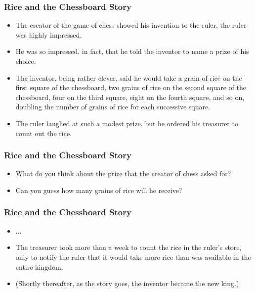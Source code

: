 \documentclass[notheorems
          ]
          {beamer}
\begin{document}
\begin{frame}
 \frametitle { Rice and the Chessboard Story  } 
 

 \begin{itemize}[<*>] 
  \item The creator of the game of chess showed his invention to the ruler, the ruler was highly impressed. 
 
  \item He was so impressed, in fact,  that he told the inventor to name a prize of his choice. 
 
  \item The inventor, being rather clever, said he would take a grain of rice on the first square of the chessboard, two grains of 
 rice on the second square of the chessboard, four on the third square, eight on the fourth square, and so on, doubling the 
 number of grains of rice for each successive square. 
 
  \item The ruler laughed at such a modest prize, but he ordered his treasurer to count out the rice.
 
 \end{itemize}

 

\end{frame}




\begin{frame}
 \frametitle{ Rice and the Chessboard Story  } 
 
 \begin{itemize}
  \item What do you think about the prize that the creator of chess asked for? 
  \item Can you guess how many grains of rice will he receive? 
 \end{itemize}


\end{frame}




\begin{frame}
 \frametitle { Rice and the Chessboard Story  } 
 

 \begin{itemize}[<*>] 
   \item ... 
  \item The treasurer took more than a week to count the rice in the ruler’s store, only to notify the ruler that it would take more 
 rice than was available in the entire kingdom. 
 
  \item (Shortly thereafter, as the story goes, the inventor became the new king.)

 \end{itemize}
 

\end{frame}
\end{document}
